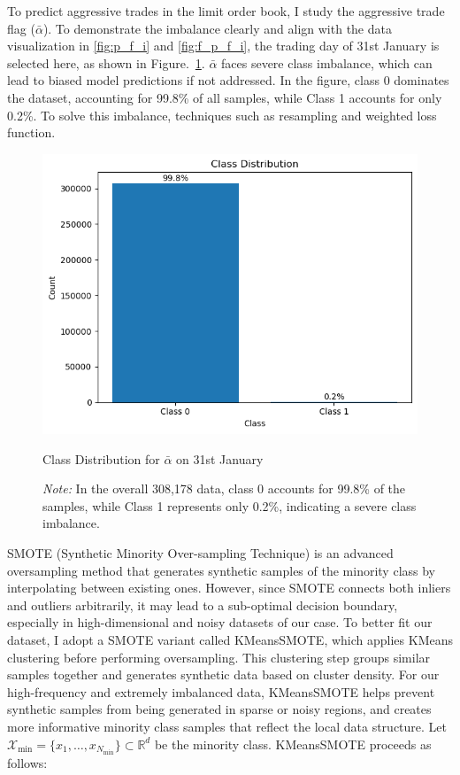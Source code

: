To predict aggressive trades in the limit order book, I study the aggressive trade flag ($\bar{\alpha}$). To demonstrate the imbalance clearly and align with the data visualization in \ref{fig:p_f_i} and \ref{fig:f_p_f_i}, the trading day of 31st January is selected here, as shown in Figure.~\ref{fig: aflag_class_distribution}. $\bar{\alpha}$ faces severe class imbalance, which can lead to biased model predictions if not addressed. In the figure, class 0 dominates the dataset, accounting for 99.8\% of all samples, while Class 1 accounts for only 0.2\%. To solve this imbalance, techniques such as resampling and weighted loss function. 
\begin{figure}[h]
    \centering
    \includegraphics[width=0.8\linewidth]{figures/Imbalaced data for aflag.png}
    \caption{Class Distribution for $\bar{\alpha}$ on 31st January}
    \caption*{\textit{Note:} In the overall 308,178 data, class 0 accounts for 99.8\% of the samples, while Class 1 represents only 0.2\%, indicating a severe class imbalance.}
    \label{fig: aflag_class_distribution}
\end{figure}

SMOTE (Synthetic Minority Over-sampling Technique) is an advanced oversampling method that generates synthetic samples of the minority class by interpolating between existing ones. However, since SMOTE connects both inliers and outliers arbitrarily, it may lead to a sub-optimal decision boundary, especially in high-dimensional and noisy datasets of our case. To better fit our dataset, I adopt a SMOTE variant called KMeansSMOTE, which applies KMeans clustering before performing oversampling. This clustering step groups similar samples together and generates synthetic data based on cluster density. For our high-frequency and extremely imbalanced data, KMeansSMOTE helps prevent synthetic samples from being generated in sparse or noisy regions, and creates more informative minority class samples that reflect the local data structure.
Let $\mathcal{X}_{\text{min}} = \{x_1, \dots, x_{N_{\text{min}}}\} \subset \mathbb{R}^d$ be the minority class. KMeansSMOTE proceeds as follows:

